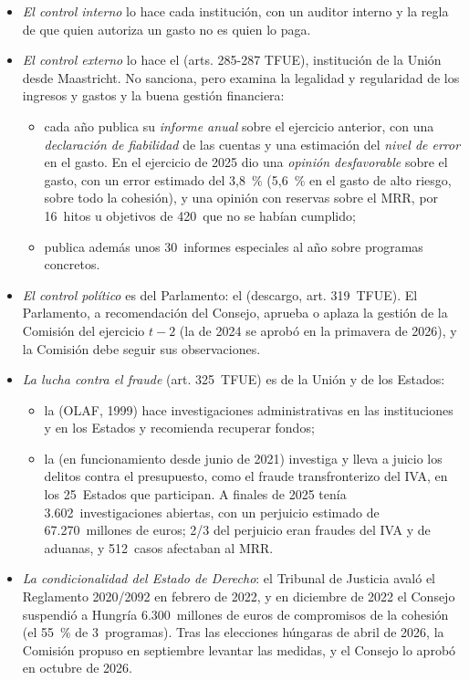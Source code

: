 \documentclass[11pt]{article}
\begin{document}
\begin{itemize}
\item \emph{El control interno} lo hace cada institución, con un auditor interno y la regla de que quien autoriza un gasto no es quien lo paga.
\item \emph{El control externo} lo hace el  (arts. 285-287 TFUE), institución de la Unión desde Maastricht. No sanciona, pero examina la legalidad y regularidad de los ingresos y gastos y la buena gestión financiera:
  \begin{itemize}
  \item cada año publica su \emph{informe anual} sobre el ejercicio anterior, con una \emph{declaración de fiabilidad} de las cuentas y una estimación del \emph{nivel de error} en el gasto. En el ejercicio de 2025 dio una \emph{opinión desfavorable} sobre el gasto, con un error estimado del 3,8~\% (5,6~\% en el gasto de alto riesgo, sobre todo la cohesión), y una opinión con reservas sobre el MRR, por 16~hitos u objetivos de 420~que no se habían cumplido\nocite{TCE2026InformeAnual};
  \item publica además unos 30~informes especiales al año sobre programas concretos.
  \end{itemize}
\item \emph{El control político} es del Parlamento: el  (descargo, art. 319~TFUE). El Parlamento, a recomendación del Consejo, aprueba o aplaza la gestión de la Comisión del ejercicio $t-2$ (la de 2024 se aprobó en la primavera de 2026), y la Comisión debe seguir sus observaciones\nocite{PE2026FichaPresupuesto}.
\item \emph{La lucha contra el fraude} (art. 325~TFUE) es de la Unión y de los Estados:
  \begin{itemize}
  \item la  (OLAF, 1999) hace investigaciones administrativas en las instituciones y en los Estados y recomienda recuperar fondos\nocite{OLAF2026Informe};
  \item la  (en funcionamiento desde junio de 2021) investiga y lleva a juicio los delitos contra el presupuesto, como el fraude transfronterizo del IVA, en los 25~Estados que participan. A finales de 2025 tenía 3.602~investigaciones abiertas, con un perjuicio estimado de 67.270~millones de euros; 2/3 del perjuicio eran fraudes del IVA y de aduanas, y 512~casos afectaban al MRR\nocite{EPPO2026Informe}.
  \end{itemize}
\item \emph{La condicionalidad del Estado de Derecho}: el Tribunal de Justicia avaló el Reglamento 2020/2092 en febrero de 2022, y en diciembre de 2022 el Consejo suspendió a Hungría 6.300~millones de euros de compromisos de la cohesión (el 55~\% de 3~programas)\nocite{UE2020Condicionalidad,Consejo2022Hungria}. Tras las elecciones húngaras de abril de 2026, la Comisión propuso en septiembre levantar las medidas, y el Consejo lo aprobó en octubre de 2026\nocite{CE2026Hungria}.
\end{itemize}
\end{document}
